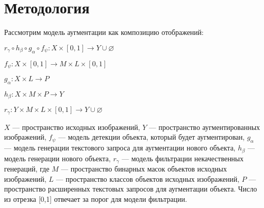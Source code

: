 \section{Методология}

Рассмотрим модель аугментации как композицию отображений:

\begin{center}

$ r_{\gamma} \circ h_{\beta} \circ g_{\alpha} \circ f_{\psi}: X \times [0,1] \to Y \cup \varnothing$


\end{center}
\begin{center}
$ f_{\psi}: X \times [0,1] \to M \times L \times [0,1]$
\end{center}
\begin{center}
$ g_{\alpha}: X \times L \to P$
\end{center}
\begin{center}
$ h_{\beta}: X \times M \times P \to Y$

\end{center}
\begin{center}
$ r_{\gamma}: Y \times M \times L \times [0,1] \to Y \cup \varnothing$

\end{center}



{$X$ — пространство исходных изображений,  
$Y$ — пространство аугментированных изображений,
$f_{\psi}$ — модель детекции объекта, который будет аугментирован, $g_{\alpha}$ — модель генерации текстового запроса для аугментации нового объекта, $h_{\beta}$ — модель генерации нового объекта, $r_{\gamma}$ — модель фильтрации некачественных генераций, где $M$ — пространство бинарных масок объектов исходных изображений,  
$L$ — пространство классов объектов исходных изображений, $P$ — пространство расширенных текстовых запросов для аугментации объекта. 
Число из отрезка [0,1] отвечает за порог для модели фильтрации.
}


